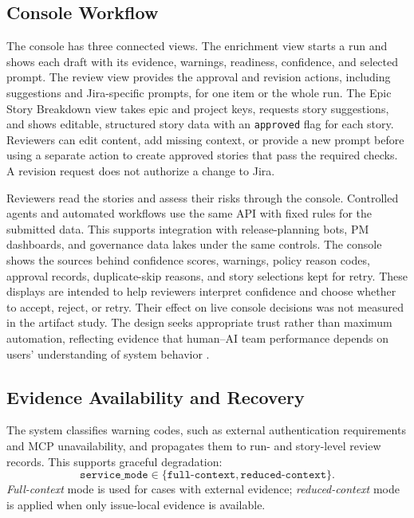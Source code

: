 \documentclass[10pt,a4paper]{article}
\begin{document}
\subsection{Console Workflow}
The console has three connected views. The enrichment view starts a run and shows each draft with its evidence, warnings, readiness, confidence, and selected prompt. The review view provides the approval and revision actions, including suggestions and Jira-specific prompts, for one item or the whole run. The Epic Story Breakdown view takes epic and project keys, requests story suggestions, and shows editable, structured story data with an \texttt{approved} flag for each story. Reviewers can edit content, add missing context, or provide a new prompt before using a separate action to create approved stories that pass the required checks. A revision request does not authorize a change to Jira.

Reviewers read the stories and assess their risks through the console. Controlled agents and automated workflows use the same API with fixed rules for the submitted data. This supports integration with release-planning bots, PM dashboards, and governance data lakes under the same controls. The console shows the sources behind confidence scores, warnings, policy reason codes, approval records, duplicate-skip reasons, and story selections kept for retry. These displays are intended to help reviewers interpret confidence and choose whether to accept, reject, or retry. Their effect on live console decisions was not measured in the artifact study. The design seeks appropriate trust rather than maximum automation, reflecting evidence that human--AI team performance depends on users' understanding of system behavior \citep{R56,R57,R76}.

\subsection{Evidence Availability and Recovery}\label{sec:evidence-recovery}

The system classifies warning codes, such as external authentication requirements and MCP unavailability, and propagates them to run- and story-level review records. This supports graceful degradation:
\begin{equation}
\texttt{service\_mode} \in \{\texttt{full-context},\texttt{reduced-context}\}.
\end{equation}
\textit{Full-context} mode is used for cases with external evidence; \textit{reduced-context} mode is applied when only issue-local evidence is available.
\end{document}
